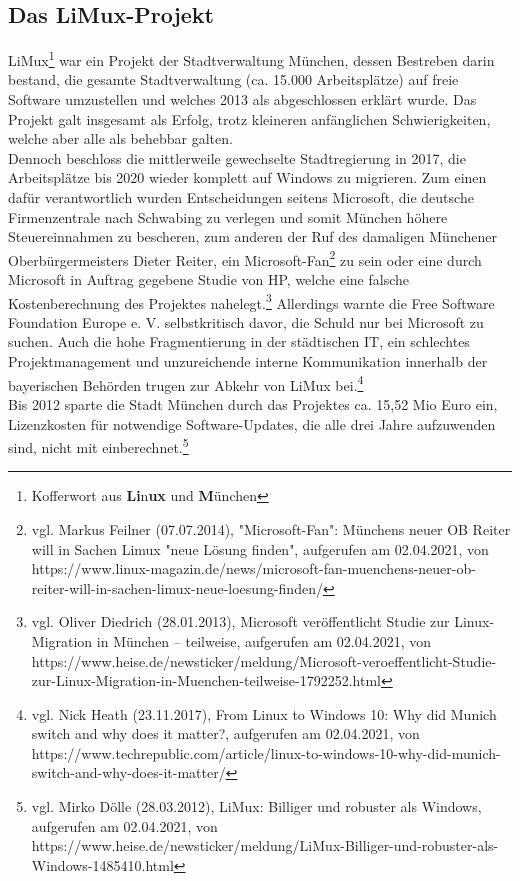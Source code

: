 \subsection{Das LiMux-Projekt}
\glqq LiMux\grqq\footnote{Kofferwort aus \textbf{Li}n\textbf{ux} und \textbf{M}ünchen} war ein Projekt der Stadtverwaltung München, dessen Bestreben darin bestand, die gesamte Stadtverwaltung (ca. 15.000 Arbeitsplätze) auf freie Software umzustellen und welches 2013 als abgeschlossen erklärt wurde. Das Projekt galt insgesamt als Erfolg, trotz kleineren anfänglichen Schwierigkeiten, welche aber alle als behebbar galten.\\
Dennoch beschloss die mittlerweile gewechselte Stadtregierung in 2017, die Arbeitsplätze bis 2020 wieder komplett auf Windows zu migrieren. Zum einen dafür verantwortlich wurden Entscheidungen seitens Microsoft, die deutsche Firmenzentrale nach Schwabing zu verlegen und somit München höhere Steuereinnahmen zu bescheren, zum anderen der Ruf des damaligen Münchener Oberbürgermeisters Dieter Reiter, ein \glqq Microsoft-Fan\grqq{}\footnote{vgl. Markus Feilner (07.07.2014), "Microsoft-Fan": Münchens neuer OB Reiter will in Sachen Limux "neue Lösung finden", aufgerufen am 02.04.2021, von https://www.linux-magazin.de/news/microsoft-fan-muenchens-neuer-ob-reiter-will-in-sachen-limux-neue-loesung-finden/} zu sein oder eine durch Microsoft in Auftrag gegebene Studie von HP, welche eine falsche Kostenberechnung des Projektes nahelegt.\footnote{vgl. Oliver Diedrich (28.01.2013), Microsoft veröffentlicht Studie zur Linux-Migration in München – teilweise, aufgerufen am 02.04.2021, von https://www.heise.de/newsticker/meldung/Microsoft-veroeffentlicht-Studie-zur-Linux-Migration-in-Muenchen-teilweise-1792252.html} Allerdings warnte die \glqq Free Software Foundation Europe e. V.\grqq{} selbstkritisch davor, die Schuld nur bei Microsoft zu suchen. Auch die hohe Fragmentierung in der städtischen IT, ein schlechtes Projektmanagement und unzureichende interne Kommunikation innerhalb der bayerischen Behörden trugen zur Abkehr von LiMux bei.\footnote{vgl. Nick Heath (23.11.2017), From Linux to Windows 10: Why did Munich switch and why does it matter?, aufgerufen am 02.04.2021, von https://www.techrepublic.com/article/linux-to-windows-10-why-did-munich-switch-and-why-does-it-matter/}\\
Bis 2012 sparte die Stadt München durch das Projektes ca. 15,52 Mio Euro ein, Lizenzkosten für notwendige Software-Updates, die alle drei Jahre aufzuwenden sind, nicht mit einberechnet.\footnote{vgl. Mirko Dölle (28.03.2012), LiMux: Billiger und robuster als Windows, aufgerufen am 02.04.2021, von https://www.heise.de/newsticker/meldung/LiMux-Billiger-und-robuster-als-Windows-1485410.html}
\vfill